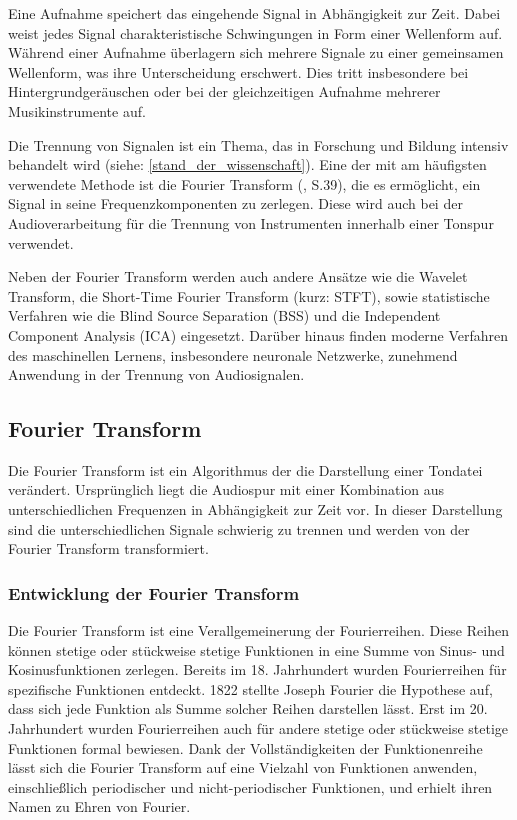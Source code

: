 Eine Aufnahme speichert das eingehende Signal in Abhängigkeit zur Zeit. Dabei weist jedes Signal charakteristische Schwingungen in Form einer Wellenform auf. Während einer Aufnahme überlagern sich mehrere Signale zu einer gemeinsamen Wellenform, was ihre Unterscheidung erschwert. Dies tritt insbesondere bei Hintergrundgeräuschen oder bei der gleichzeitigen Aufnahme mehrerer Musikinstrumente auf.

\par

Die Trennung von Signalen ist ein Thema, das in Forschung und Bildung intensiv behandelt wird (siehe: \cref{stand_der_wissenschaft}). Eine der mit am häufigsten verwendete Methode ist die Fourier Transform (\cite{fundamentals_of_music_processing}, S.39), die es ermöglicht, ein Signal in seine Frequenzkomponenten zu zerlegen. Diese wird auch bei der Audioverarbeitung für die Trennung von Instrumenten innerhalb einer Tonspur verwendet.

\par

Neben der Fourier Transform werden auch andere Ansätze wie die Wavelet Transform, die Short-Time Fourier Transform (kurz: STFT), sowie statistische Verfahren wie die Blind Source Separation (BSS) und die Independent Component Analysis (ICA) eingesetzt. Darüber hinaus finden moderne Verfahren des maschinellen Lernens, insbesondere neuronale Netzwerke, zunehmend Anwendung in der Trennung von Audiosignalen.

%
\subsection{Fourier Transform}
%

Die Fourier Transform ist ein Algorithmus der die Darstellung einer Tondatei verändert. Ursprünglich liegt die Audiospur mit einer Kombination aus unterschiedlichen Frequenzen in Abhängigkeit zur Zeit vor. In dieser Darstellung sind die unterschiedlichen Signale schwierig zu trennen und werden von der Fourier Transform transformiert.

\par

%
\subsubsection{Entwicklung der Fourier Transform}
%

Die Fourier Transform ist eine Verallgemeinerung der Fourierreihen. Diese Reihen können stetige oder stückweise stetige Funktionen in eine Summe von Sinus- und Kosinusfunktionen zerlegen. Bereits im 18. Jahrhundert wurden Fourierreihen für spezifische Funktionen entdeckt. 1822 stellte Joseph Fourier die Hypothese auf, dass sich jede Funktion als Summe solcher Reihen darstellen lässt. Erst im 20. Jahrhundert wurden Fourierreihen auch für andere stetige oder stückweise stetige Funktionen formal bewiesen. Dank der Vollständigkeiten der Funktionenreihe lässt sich die Fourier Transform auf eine Vielzahl von Funktionen anwenden, einschließlich periodischer und nicht-periodischer Funktionen, und erhielt ihren Namen zu Ehren von Fourier.

